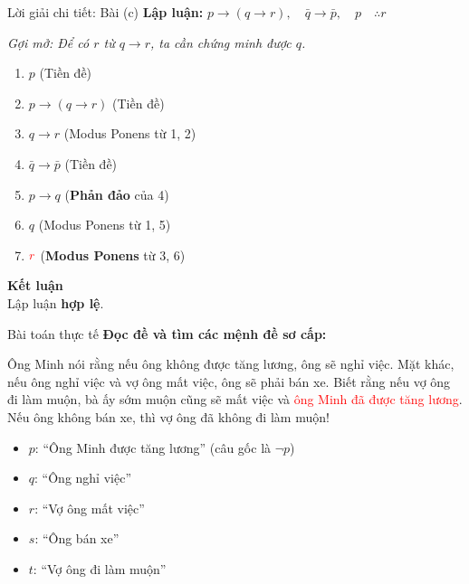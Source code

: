 \documentclass[aspectratio=169, 11pt]{beamer}
\begin{document}
\begin{frame}{Lời giải chi tiết: Bài (c)}
\textbf{Lập luận:} $p \rightarrow (q \rightarrow r),\quad \bar{q} \rightarrow \bar{p},\quad p\quad \therefore r$

\vspace{0.15cm}
\textit{Gợi mở: Để có $r$ từ $q \rightarrow r$, ta cần chứng minh được $q$.}

\vspace{0.15cm}
\begin{enumerate}
  \item[\textcolor{uitblue}{1.}] $p$ \hfill (Tiền đề)
  \item[\textcolor{uitblue}{2.}] $p \rightarrow (q \rightarrow r)$ \hfill (Tiền đề)
  \item[\textcolor{uitblue}{3.}] $q \rightarrow r$ \hfill (Modus Ponens từ 1, 2)
  \item[\textcolor{uitblue}{4.}] $\bar{q} \rightarrow \bar{p}$ \hfill (Tiền đề)
  \item[\textcolor{uitblue}{5.}] $p \rightarrow q$ \hfill (\textbf{Phản đảo} của 4)
  \item[\textcolor{uitblue}{6.}] $q$ \hfill (Modus Ponens từ 1, 5)
  \item[\textcolor{uitblue}{7.}] $\textcolor{red}{r}$ \hfill (\textbf{Modus Ponens} từ 3, 6)
\end{enumerate}

\vspace{0.2cm}
{\large\textbf{\color{red}Kết luận}}\\
\vspace{0.05cm}
Lập luận \textbf{hợp lệ}.
\end{frame}

\begin{frame}{Bài toán thực tế}
\textbf{Đọc đề và tìm các mệnh đề sơ cấp:}

\vspace{0.15cm}
Ông Minh nói rằng nếu ông không được tăng lương, ông sẽ nghỉ việc. Mặt khác, nếu ông nghỉ việc và vợ ông mất việc, ông sẽ phải bán xe. Biết rằng nếu vợ ông đi làm muộn, bà ấy sớm muộn cũng sẽ mất việc và \textcolor{red}{ông Minh đã được tăng lương}. Nếu ông không bán xe, thì vợ ông đã không đi làm muộn!

\vspace{0.25cm}
\begin{itemize}
  \item $p$: ``Ông Minh được tăng lương'' (câu gốc là $\neg p$)
  \item $q$: ``Ông nghỉ việc''
  \item $r$: ``Vợ ông mất việc''
  \item $s$: ``Ông bán xe''
  \item $t$: ``Vợ ông đi làm muộn''
\end{itemize}
\end{frame}
\end{document}
